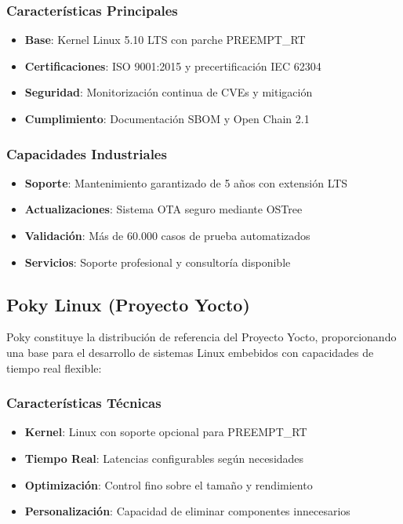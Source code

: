        \subsubsection{Características Principales}
            \begin{itemize}
                \item \textbf{Base}: Kernel Linux 5.10 LTS con parche PREEMPT\_RT
                \item \textbf{Certificaciones}: ISO 9001:2015 y precertificación IEC 62304
                \item \textbf{Seguridad}: Monitorización continua de CVEs y mitigación
                \item \textbf{Cumplimiento}: Documentación SBOM y Open Chain 2.1
            \end{itemize}

        \subsubsection{Capacidades Industriales}
            \begin{itemize}
                \item \textbf{Soporte}: Mantenimiento garantizado de 5 años con extensión LTS
                \item \textbf{Actualizaciones}: Sistema OTA seguro mediante OSTree
                \item \textbf{Validación}: Más de 60.000 casos de prueba automatizados
                \item \textbf{Servicios}: Soporte profesional y consultoría disponible
            \end{itemize}

    \subsection{Poky Linux (Proyecto Yocto)}
        Poky constituye la distribución de referencia del Proyecto Yocto, proporcionando una base para el desarrollo de sistemas Linux embebidos con capacidades de tiempo real flexible:

        \subsubsection{Características Técnicas}
            \begin{itemize}
                \item \textbf{Kernel}: Linux con soporte opcional para PREEMPT\_RT
                \item \textbf{Tiempo Real}: Latencias configurables según necesidades
                \item \textbf{Optimización}: Control fino sobre el tamaño y rendimiento
                \item \textbf{Personalización}: Capacidad de eliminar componentes innecesarios
            \end{itemize}

